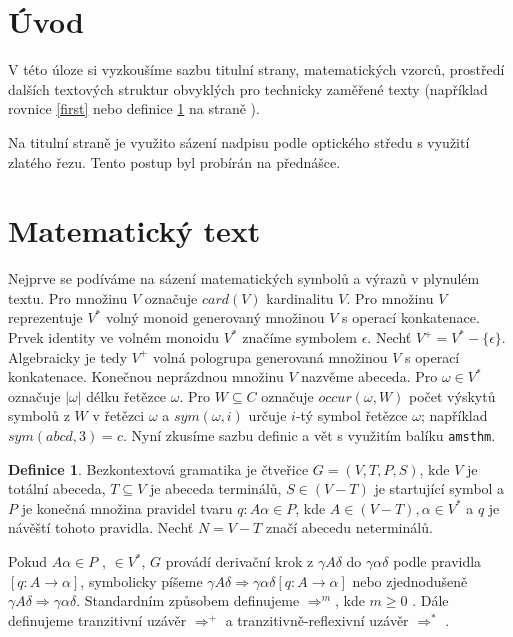 \documentclass[11pt]{article}
\theoremstyle{definition}
\newtheorem{def1}{Definice}[section]
\theoremstyle{plain}
\begin{document}
	\begin{multicols*}{2}	
	
	\section*{Úvod}
	V této úloze si vyzkoušíme sazbu titulní strany, matematických vzorců, prostředí
	dalších textových struktur obvyklých pro technicky zaměřené texty (například
	rovnice \eqref{first} nebo definice \ref{test} na straně \pageref{test}).

	Na titulní straně je využito sázení nadpisu podle optického středu s využití
	zlatého řezu. Tento postup byl probírán na přednášce.


	\section{Matematický text}
	\label{first}

	Nejprve se podíváme na sázení matematických symbolů a výrazů v plynulém textu. Pro
	množinu $V$ označuje $card(V)$ kardinalitu $V$.
	Pro množinu $V$ reprezentuje $V^*$ volný monoid generovaný množinou $V$ s operací
	konkatenace. Prvek identity ve volném monoidu $V^*$ značíme symbolem $\epsilon$.
	Nechť $V^+ = V^* - \{\epsilon\}$. Algebraicky je tedy $V^+$ volná pologrupa
	generovaná množinou $V$ s operací konkatenace. Konečnou neprázdnou množinu $V$
	nazvěme abeceda. Pro $\omega \in V^*$ označuje $|\omega|$ délku řetězce $\omega$.
	Pro $W \subseteq C$ označuje $occur(\omega, W)$ počet výskytů symbolů z $W$ v
	řetězci $\omega$ a $sym(\omega, i)$ určuje $i$-tý symbol řetězce $\omega$;
	například $sym(abcd, 3) = c$.
	Nyní zkusíme sazbu definic a vět s využitím balíku \texttt{amsthm}.
	
	\begin{def1}
	\label{test}
	Bezkontextová gramatika je čtveřice $G = (V, T, P, S)$, kde $V$ je totální abeceda, $T
	\subseteq V$ je abeceda terminálů, $ S \in (V-T)$ je startující symbol a $P$ je konečná množina pravidel tvaru $ q: A \alpha \in P$,
	kde $ A \in ( V - T ), \alpha \in V^* $ a $q$ je návěští tohoto pravidla. Nechť $N = V - T$ značí abecedu neterminálů.
	
	Pokud $ A \alpha \in P$ , $ \in V^*$, $G$ provádí derivační krok z $\gamma A \delta$ do $\gamma \alpha \delta$ podle pravidla $[q\colon A\rightarrow \alpha] $, symbolicky
	píšeme $\gamma A \delta \Rightarrow \gamma \alpha \delta [q\colon A\rightarrow \alpha] $ nebo zjednodušeně $\gamma A \delta \Rightarrow \gamma \alpha \delta$. Standardním způsobem definujeme $\Rightarrow^m$, kde $m\geq 0$ . Dále
	definujeme tranzitivní uzávěr  $\Rightarrow^+$ a tranzitivně-reflexivní uzávěr  $\Rightarrow^*$ .
	

\end{def1}
\end{multicols*}
\end{document}
